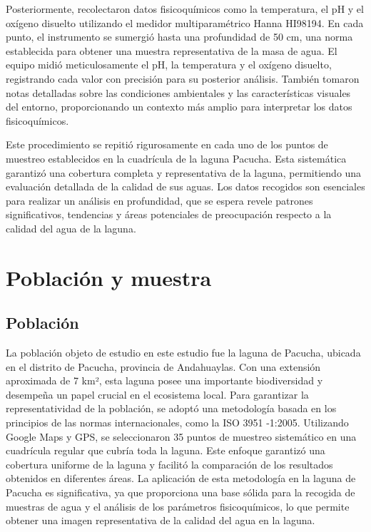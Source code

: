 Posteriormente, recolectaron datos fisicoquímicos como la temperatura, el pH y el oxígeno disuelto utilizando el medidor multiparamétrico Hanna HI98194. En cada punto, el instrumento se sumergió hasta una profundidad de 50 cm, una norma establecida para obtener una muestra representativa de la masa de agua. El equipo midió meticulosamente el pH, la temperatura y el oxígeno disuelto, registrando cada valor con precisión para su posterior análisis. También tomaron notas detalladas sobre las condiciones ambientales y las características visuales del entorno, proporcionando un contexto más amplio para interpretar los datos fisicoquímicos.

Este procedimiento se repitió rigurosamente en cada uno de los puntos de muestreo establecidos en la cuadrícula de la laguna Pacucha. Esta sistemática garantizó una cobertura completa y representativa de la laguna, permitiendo una evaluación detallada de la calidad de sus aguas. Los datos recogidos son esenciales para realizar un análisis en profundidad, que se espera revele patrones significativos, tendencias y áreas potenciales de preocupación respecto a la calidad del agua de la laguna.



\section{Población y muestra}
\subsection{Población}

 La población objeto de estudio en este estudio fue la laguna de Pacucha, ubicada en el distrito de Pacucha, provincia de Andahuaylas.
 Con una extensión aproximada de 7 km², esta laguna posee una importante biodiversidad y desempeña un papel crucial en el ecosistema local. Para garantizar la representatividad de la población, se adoptó una metodología basada en los principios de las normas internacionales, como la ISO 3951 -1:2005. Utilizando Google Maps y GPS, se seleccionaron 35 puntos de muestreo sistemático en una cuadrícula regular que cubría toda la laguna. Este enfoque garantizó una cobertura uniforme de la laguna y facilitó la comparación de los resultados obtenidos en diferentes áreas. La aplicación de esta metodología en la laguna de Pacucha es significativa, ya que proporciona una base sólida para la recogida de muestras de agua y el análisis de los parámetros fisicoquímicos, lo que permite obtener una imagen representativa de la calidad del agua en la laguna.

